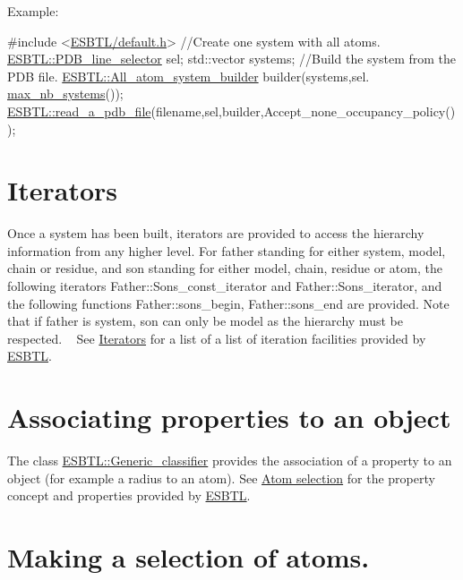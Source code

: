 Example\+: 
\begin{DoxyCode}
\textcolor{preprocessor}{#include <\hyperlink{default_8h}{ESBTL/default.h}>}
\textcolor{comment}{//Create one system with all atoms.}
\hyperlink{classESBTL_1_1PDB__line__selector}{ESBTL::PDB\_line\_selector} sel;
std::vector systems;
\textcolor{comment}{//Build the system from the PDB file.}
\hyperlink{classESBTL_1_1All__atom__system__builder}{ESBTL::All\_atom\_system\_builder} builder(systems,sel.
      \hyperlink{classESBTL_1_1PDB__line__selector_acce91d190ab3c2f9361374aa42c7ffca}{max\_nb\_systems}());
\hyperlink{namespaceESBTL_a850d3496f54d82687ff0109404cabd35}{ESBTL::read\_a\_pdb\_file}(filename,sel,builder,Accept\_none\_occupancy\_policy()); 
\end{DoxyCode}
\hypertarget{index_iters}{}\section{Iterators}\label{index_iters}
Once a system has been built, iterators are provided to access the hierarchy information from any higher level. For \textquotesingle{}father\textquotesingle{} standing for either system, model, chain or residue, and \textquotesingle{}son\textquotesingle{} standing for either model, chain, residue or atom, the following iterators Father\+::\+Sons\+\_\+const\+\_\+iterator and Father\+::\+Sons\+\_\+iterator, and the following functions Father\+::sons\+\_\+begin, Father\+::sons\+\_\+end are provided. Note that if \textquotesingle{}father\textquotesingle{} is system, \textquotesingle{}son\textquotesingle{} can only be model as the hierarchy must be respected. ~\newline
See \hyperlink{group__grp__iters}{Iterators} for a list of a list of iteration facilities provided by \hyperlink{namespaceESBTL}{E\+S\+B\+TL}.\hypertarget{index_assos_prop}{}\section{Associating properties to an object}\label{index_assos_prop}
The class \hyperlink{structESBTL_1_1Generic__classifier}{E\+S\+B\+T\+L\+::\+Generic\+\_\+classifier} provides the association of a property to an object (for example a radius to an atom). See \hyperlink{group__atomsel}{Atom selection} for the property concept and properties provided by \hyperlink{namespaceESBTL}{E\+S\+B\+TL}.\hypertarget{index_sec_atom_sel}{}\section{Making a selection of atoms.}\label{index_sec_atom_sel}

